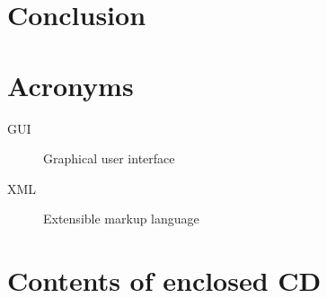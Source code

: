 \documentclass[thesis=B,english]{FITthesis}[2019/12/23]
\begin{document}
\chapter{Conclusion}





\appendix

\chapter{Acronyms}
\begin{description}
	\item[GUI] Graphical user interface
	\item[XML] Extensible markup language
\end{description}


\chapter{Contents of enclosed CD}


\end{document}
